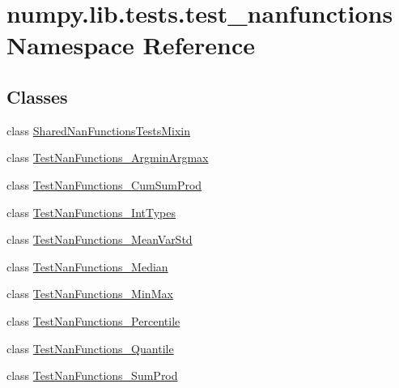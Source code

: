 \hypertarget{namespacenumpy_1_1lib_1_1tests_1_1test__nanfunctions}{}\section{numpy.\+lib.\+tests.\+test\+\_\+nanfunctions Namespace Reference}
\label{namespacenumpy_1_1lib_1_1tests_1_1test__nanfunctions}
\subsection*{Classes}
\begin{DoxyCompactItemize}
\item 
class \hyperlink{classnumpy_1_1lib_1_1tests_1_1test__nanfunctions_1_1SharedNanFunctionsTestsMixin}{Shared\+Nan\+Functions\+Tests\+Mixin}
\item 
class \hyperlink{classnumpy_1_1lib_1_1tests_1_1test__nanfunctions_1_1TestNanFunctions__ArgminArgmax}{Test\+Nan\+Functions\+\_\+\+Argmin\+Argmax}
\item 
class \hyperlink{classnumpy_1_1lib_1_1tests_1_1test__nanfunctions_1_1TestNanFunctions__CumSumProd}{Test\+Nan\+Functions\+\_\+\+Cum\+Sum\+Prod}
\item 
class \hyperlink{classnumpy_1_1lib_1_1tests_1_1test__nanfunctions_1_1TestNanFunctions__IntTypes}{Test\+Nan\+Functions\+\_\+\+Int\+Types}
\item 
class \hyperlink{classnumpy_1_1lib_1_1tests_1_1test__nanfunctions_1_1TestNanFunctions__MeanVarStd}{Test\+Nan\+Functions\+\_\+\+Mean\+Var\+Std}
\item 
class \hyperlink{classnumpy_1_1lib_1_1tests_1_1test__nanfunctions_1_1TestNanFunctions__Median}{Test\+Nan\+Functions\+\_\+\+Median}
\item 
class \hyperlink{classnumpy_1_1lib_1_1tests_1_1test__nanfunctions_1_1TestNanFunctions__MinMax}{Test\+Nan\+Functions\+\_\+\+Min\+Max}
\item 
class \hyperlink{classnumpy_1_1lib_1_1tests_1_1test__nanfunctions_1_1TestNanFunctions__Percentile}{Test\+Nan\+Functions\+\_\+\+Percentile}
\item 
class \hyperlink{classnumpy_1_1lib_1_1tests_1_1test__nanfunctions_1_1TestNanFunctions__Quantile}{Test\+Nan\+Functions\+\_\+\+Quantile}
\item 
class \hyperlink{classnumpy_1_1lib_1_1tests_1_1test__nanfunctions_1_1TestNanFunctions__SumProd}{Test\+Nan\+Functions\+\_\+\+Sum\+Prod}
\end{DoxyCompactItemize}
